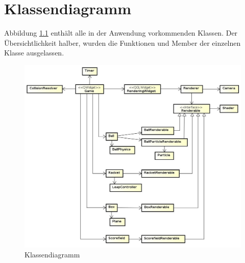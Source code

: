
\chapter{Klassendiagramm}
%
Abbildung \ref{fig:classDiagram} enthält alle in der Anwendung vorkommenden Klassen. Der Übersichtlichkeit halber, wurden die Funktionen und Member der einzelnen Klasse ausgelassen. 

\begin{figure}[h]
\centering
\includegraphics[width=0.9\linewidth]{bilder/classDiagram}
\caption{Klassendiagramm}
\label{fig:classDiagram}
\end{figure}


